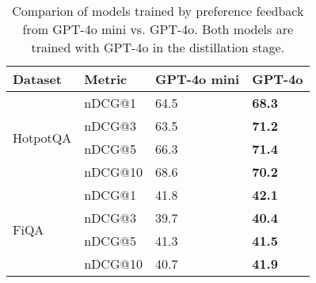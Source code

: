 \begin{table}[t!]
    \centering
    \begin{adjustbox}{width=.37\textwidth,center}
    \begin{tabular}{l|l|l|l}
\hline
\textbf{Dataset}          & \textbf{Metric} & \textbf{GPT-4o mini} & \textbf{GPT-4o} \\ \hline
\multirow{4}{*}{HotpotQA} & nDCG@1          &     64.5                               &           \textbf{68.3}                    \\
                          & nDCG@3          &   63.5                                 &    \textbf{71.2}                           \\ 
                          & nDCG@5          &     66.3                              &        \textbf{71.4}                       \\ 
                          & nDCG@10         &     68.6                              &    \textbf{70.2}                            \\ \hline
\multirow{4}{*}{FiQA}     & nDCG@1          &        41.8                            &          \textbf{42.1}                     \\ 
                          & nDCG@3          &     39.7                               &      \textbf{40.4}                         \\ 
                          & nDCG@5          &       41.3                             &          \textbf{41.5}                     \\  
                          & nDCG@10         &      40.7                              &       \textbf{41.9}                        \\ \hline
\end{tabular}
\end{adjustbox}
\caption{Comparion of models trained by preference feedback from GPT-4o mini vs. GPT-4o. Both models are trained with GPT-4o in the distillation stage.}
\label{tab:ablation_llm_stage2}
\end{table}

